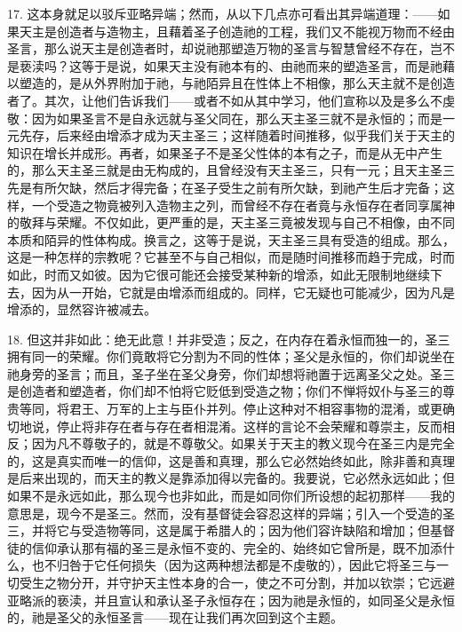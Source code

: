 17. 这本身就足以驳斥亚略异端；然而，从以下几点亦可看出其异端道理：——如果天主是创造者与造物主，且藉着圣子创造祂的工程，我们又不能视万物而不经由圣言，那么说天主是创造者时，却说祂那塑造万物的圣言与智慧曾经不存在，岂不是亵渎吗？这等于是说，如果天主没有祂本有的、由祂而来的塑造圣言，而是祂藉以塑造的，是从外界附加于祂，与祂陌异且在性体上不相像，那么天主就不是创造者了。其次，让他们告诉我们——或者不如从其中学习，他们宣称以及是多么不虔敬：因为如果圣言不是自永远就与圣父同在，那么天主圣三就不是永恒的；而是一元先存，后来经由增添才成为天主圣三；这样随着时间推移，似乎我们关于天主的知识在增长并成形。再者，如果圣子不是圣父性体的本有之子，而是从无中产生的，那么天主圣三就是由无构成的，且曾经没有天主圣三，只有一元；且天主圣三先是有所欠缺，然后才得完备；在圣子受生之前有所欠缺，到祂产生后才完备；这样，一个受造之物竟被列入造物主之列，而曾经不存在者竟与永恒存在者同享属神的敬拜与荣耀。不仅如此，更严重的是，天主圣三竟被发现与自己不相像，由不同本质和陌异的性体构成。换言之，这等于是说，天主圣三具有受造的组成。那么，这是一种怎样的宗教呢？它甚至不与自己相似，而是随时间推移而趋于完成，时而如此，时而又如彼。因为它很可能还会接受某种新的增添，如此无限制地继续下去，因为从一开始，它就是由增添而组成的。同样，它无疑也可能减少，因为凡是增添的，显然容许被减去。\par

18. 但这并非如此：绝无此意！并非受造；反之，在内存在着永恒而独一的，圣三拥有同一的荣耀。你们竟敢将它分割为不同的性体；圣父是永恒的，你们却说坐在祂身旁的圣言；而且，圣子坐在圣父身旁，你们却想将祂置于远离圣父之处。圣三是创造者和塑造者，你们却不怕将它贬低到受造之物；你们不惮将奴仆与圣三的尊贵等同，将君王、万军的上主与臣仆并列。停止这种对不相容事物的混淆，或更确切地说，停止将非存在者与存在者相混淆。这样的言论不会荣耀和尊崇主，反而相反；因为凡不尊敬子的，就是不尊敬父。如果关于天主的教义现今在圣三内是完全的，这是真实而唯一的信仰，这是善和真理，那么它必然始终如此，除非善和真理是后来出现的，而天主的教义是靠添加得以完备的。我要说，它必然永远如此；但如果不是永远如此，那么现今也非如此，而是如同你们所设想的起初那样——我的意思是，现今不是圣三。然而，没有基督徒会容忍这样的异端；引入一个受造的圣三，并将它与受造物等同，这是属于希腊人的；因为他们容许缺陷和增加；但基督徒的信仰承认那有福的圣三是永恒不变的、完全的、始终如它曾所是，既不加添什么，也不归咎于它任何损失（因为这两种想法都是不虔敬的），因此它将圣三与一切受生之物分开，并守护天主性本身的合一，使之不可分割，并加以钦崇；它远避亚略派的亵渎，并且宣认和承认圣子永恒存在；因为祂是永恒的，如同圣父是永恒的，祂是圣父的永恒圣言——现在让我们再次回到这个主题。\par

